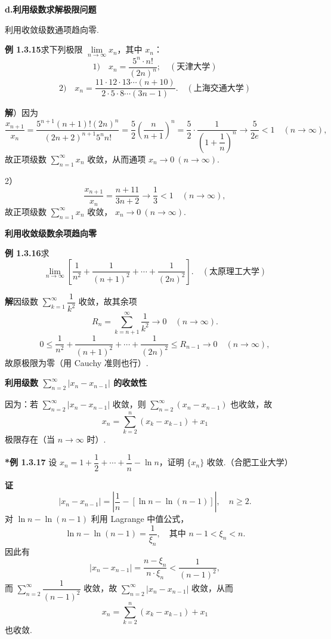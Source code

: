 \documentclass[UTF8,12pt,a4paper,fontset=fandol]{ctexart}
\begin{document}
\noindent\textbf{d.\quad 利用级数求解极限问题}

利用收敛级数通项趋向零.

\noindent\textbf{例 1.3.15}\quad 求下列极限 $\lim\limits_{n\to\infty}x_n$，其中 $x_n$：
\[
1)\quad x_n=\frac{5^n\cdot n!}{(2n)^n};\quad(\text{天津大学})
\]
\[
2)\quad
x_n=\frac{11\cdot12\cdot13\cdots(n+10)}
{2\cdot5\cdot8\cdots(3n-1)}.
\quad(\text{上海交通大学})
\]

\noindent\textbf{解}）因为
\[
  \frac{x_{n+1}}{x_n}
  =\frac{5^{n+1}(n+1)!(2n)^n}{(2n+2)^{n+1}5^nn!}
  =\frac52\left(\frac n{n+1}\right)^n
  =\frac52\cdot\frac1{\left(1+\dfrac1n\right)^n}
  \to\frac5{2e}<1\quad(n\to\infty),
\]
故正项级数 $\sum\limits_{n=1}^\infty x_n$ 收敛，从而通项
$x_n\to0\ (n\to\infty)$.

2）
\[
  \frac{x_{n+1}}{x_n}
  =\frac{n+11}{3n+2}\to\frac13<1\quad(n\to\infty),
\]
故正项级数 $\sum\limits_{n=1}^\infty x_n$ 收敛，
$x_n\to0\ (n\to\infty)$.

\noindent\textbf{利用收敛级数余项趋向零}

\noindent\textbf{例 1.3.16}\quad 求
\[
  \lim_{n\to\infty}
  \left[\frac1{n^2}+\frac1{(n+1)^2}+\cdots+\frac1{(2n)^2}\right].
\quad(\text{太原理工大学})
\]

\noindent\textbf{解}\quad 因级数 $\sum\limits_{k=1}^\infty\dfrac1{k^2}$ 收敛，故其余项
\[
  R_n=\sum_{k=n+1}^\infty\frac1{k^2}\to0\quad(n\to\infty).
\]
\[
  0\le
  \frac1{n^2}+\frac1{(n+1)^2}+\cdots+\frac1{(2n)^2}
  \le R_{n-1}\to0\quad(n\to\infty),
\]
故原极限为零（用 Cauchy 准则也行）.

\noindent\textbf{利用级数 $\sum\limits_{n=2}^\infty|x_n-x_{n-1}|$ 的收敛性}

因为：若 $\sum\limits_{n=2}^\infty|x_n-x_{n-1}|$ 收敛，则
$\sum\limits_{n=2}^\infty(x_n-x_{n-1})$ 也收敛，故
\[
  x_n=\sum_{k=2}^n(x_k-x_{k-1})+x_1
\]
极限存在（当 $n\to\infty$ 时）.

\noindent\textbf{*例 1.3.17}\quad
设 $x_n=1+\dfrac12+\cdots+\dfrac1n-\ln n$，证明 $\{x_n\}$ 收敛.（合肥工业大学）

\noindent\textbf{证}\quad
\[
  |x_n-x_{n-1}|
  =\left|\frac1n-[\ln n-\ln(n-1)]\right|,
  \quad n\ge2.
\]
对 $\ln n-\ln(n-1)$ 利用 Lagrange 中值公式，
\[
  \ln n-\ln(n-1)=\frac1{\xi_n},
  \quad\text{其中 }n-1<\xi_n<n.
\]
因此有
\[
  |x_n-x_{n-1}|
  =\frac{n-\xi_n}{n\cdot\xi_n}
  <\frac1{(n-1)^2},
\]
而 $\sum\limits_{n=2}^\infty\dfrac1{(n-1)^2}$ 收敛，故
$\sum\limits_{n=2}^\infty|x_n-x_{n-1}|$ 收敛，从而
\[
  x_n=\sum_{k=2}^n(x_k-x_{k-1})+x_1
\]
也收敛.
\end{document}
